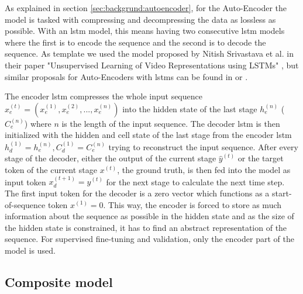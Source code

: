 As explained in section \ref{sec:backgrund:autoencoder}, for the Auto-Encoder the model is tasked with compressing and decompressing the data as lossless as possible. With an \gls{lstm} model, this means having two consecutive \gls{lstm} models where the first is to encode the sequence and the second is to decode the sequence. As template we used the model proposed by Nitish Srivastava et al. in their paper "Unsupervised Learning of Video Representations using LSTMs" \cite{unsupervised_learning_lstms}, but similar proposals for Auto-Encoders with \glspl{lstm} can be found in \cite{unsupervised_learning_lstms_timeseries} or \cite{lstm_anomaly_detection}. \par
The encoder \gls{lstm} compresses the whole input sequence $x_e^{(t)} = (x_e^{(1)}, x_e^{(2)}, ..., x_e^{(n)})$ into the hidden state of the last stage $h_e^{(n)}$ ($C_e^{(n)}$) where $n$ is the length of the input sequence. The decoder \gls{lstm} is then initialized with the hidden and cell state of the last stage from the encoder \gls{lstm} $h_d^{(1)} = h_e^{(n)}, C_d^{(1)} = C_e^{(n)}$ trying to reconstruct the input sequence. After every stage of the decoder, either the output of the current stage $\hat{y}^{(t)}$ or the target token of the current stage $x^{(t)}$, the ground truth, is then fed into the model as input token  $x_d^{(t+1)} = \hat{y}^{(t)}$ for the next stage to calculate the next time step. The first input token for the decoder is a zero vector which functions as a start-of-sequence token $x^{(1)} = 0$. This way, the encoder is forced to store as much information about the sequence as possible in the hidden state and as the size of the hidden state is constrained, it has to find an abstract representation of the sequence. For supervised fine-tuning and validation, only the encoder part of the model is used. 

\subsection{Composite model} \label{sec:experiments:lstm:composite}

